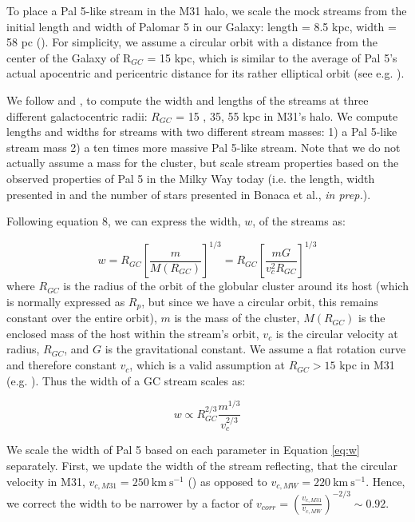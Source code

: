 \documentclass[twocolumn]{aastex62}
\newcommand{\kms}{\ensuremath{\textrm{km}~\textrm{s}^{-1}}}
\begin{document}
To place a Pal 5-like stream in the M31 halo, %
we scale the mock streams from the initial length and width of Palomar 5 in our Galaxy: length = 8.5 kpc, width = 58 pc (\citealt{ibata16}). For simplicity, we assume a circular orbit with a distance from the center of the Galaxy of R$_{GC}$ = 15 kpc, which is similar to the average of Pal 5's actual apocentric and pericentric distance for its rather elliptical orbit (see e.g. \citealt{erkal17}). 

We follow \citet{johnston98} and \citet{johnston01}, to compute the width and lengths of the streams at three different galactocentric radii: $R_{GC}$ = 15 , 35, 55 kpc in M31's halo. We compute lengths and widths for streams with two different stream masses: 1) a Pal 5-like stream mass 2) a ten times more massive Pal 5-like stream. Note that we do not actually assume a mass for the cluster, but scale stream properties based on the observed properties of Pal 5 in the Milky Way today (i.e. the length, width presented in \citealt{ibata16} and the number of stars presented in Bonaca et al., {\it in prep.}).  

Following \citet{johnston01} equation 8, we can express the width, $w$, of the streams as:

\begin{equation}
w = R_{GC} \left[\frac{m}{M(R_{GC})}\right]^{1/3} = R_{GC} \left[\frac{m G}{v_c^2 R_{GC}}\right]^{1/3} 
\end{equation}
where $R_{GC}$ is the radius of the orbit of the globular cluster around its host (which is normally expressed as $R_p$, but since we have a circular orbit, this remains constant over the entire orbit), $m$ is the mass of the cluster, $M(R_{GC})$ is the enclosed mass of the host within the stream's orbit, $v_c$ is the circular velocity at radius, $R_{GC}$, and $G$ is the gravitational constant. We assume a flat rotation curve and therefore constant  $v_c$, which is a valid assumption at $R_{GC} > 15$ kpc in M31 (e.g. \citealt{chemin09}). Thus the width of a GC stream scales as:

\begin{equation}
\label{eq:w}
w \propto R_{GC}^{2/3} \frac{m^{1/3}}{v_c^{2/3}}
\end{equation}

We scale the width of Pal 5 based on each parameter in Equation \ref{eq:w} separately. First, we update the width of the stream reflecting, that the circular velocity in M31, $v_{c, M31}= 250 ~\kms$  (\citealt{chemin09}) as opposed to  $v_{c, MW}= 220 ~\kms$. Hence, we correct the width to be narrower by a factor of $v_{corr} =  \left(\frac{v_{c,M31}}{v_{c,MW}}\right)^{-2/3} \sim 0.92$. 
\end{document}
